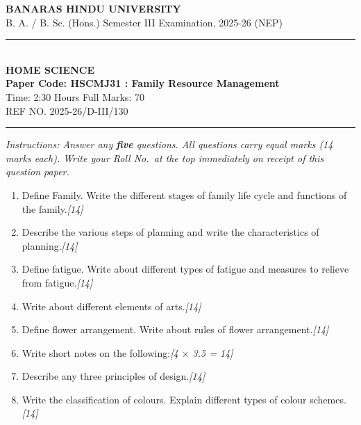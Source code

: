 \documentclass[11pt,a4paper]{article}
\newcommand{\pts}[1]{\hfill \textit{[#1]}}
\begin{document}
\begin{center}
  {\large\bfseries BANARAS HINDU UNIVERSITY}\\[2pt]
  {\normalsize B. A. / B. Sc. (Hons.) Semester III Examination, 2025-26 (NEP)}\\[6pt]
  \rule{0.8\linewidth}{0.5pt}\\[6pt]
  {\large\bfseries HOME SCIENCE}\\[4pt]
  {\large\bfseries Paper Code: HSCMJ31 : Family Resource Management}\\[4pt]
  {\normalsize Time: 2:30 Hours \hfill Full Marks: 70}\\[2pt]
  {\small REF NO. 2025-26/D-III/130}
\end{center}
\rule{\linewidth}{0.4pt}
\smallskip

\noindent \textit{Instructions: Answer any \textbf{five} questions. All questions carry equal marks (14 marks each). Write your Roll No.\ at the top immediately on receipt of this question paper.}

\bigskip

\begin{enumerate}[label=\textbf{\arabic*.},leftmargin=*,itemsep=12pt]

  \item Define Family. Write the different stages of family life cycle and functions of the family.\pts{14}

  \item Describe the various steps of planning and write the characteristics of planning.\pts{14}

  \item Define fatigue. Write about different types of fatigue and measures to relieve from fatigue.\pts{14}

  \item Write about different elements of arts.\pts{14}

  \item Define flower arrangement. Write about rules of flower arrangement.\pts{14}

  \item Write short notes on the following:\pts{4 $\times$ 3.5 = 14}

  \item Describe any three principles of design.\pts{14}

  \item Write the classification of colours. Explain different types of colour schemes.\pts{14}

\end{enumerate}
\end{document}
